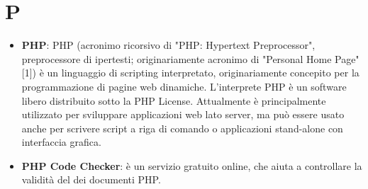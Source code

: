 \section{P}
\begin{itemize} 
	\item
	\textbf{PHP}: PHP (acronimo ricorsivo di "PHP: Hypertext Preprocessor", preprocessore di ipertesti; originariamente acronimo di "Personal Home Page"[1]) è un linguaggio di scripting interpretato, originariamente concepito per la programmazione di pagine web dinamiche. L'interprete PHP è un software libero distribuito sotto la PHP License. Attualmente è principalmente utilizzato per sviluppare applicazioni web lato server, ma può essere usato anche per scrivere script a riga di comando o applicazioni stand-alone con interfaccia grafica.
	 
	\item
	\textbf{PHP Code Checker}: è un servizio gratuito online, che aiuta a controllare la validità del dei documenti PHP.
\end{itemize}

